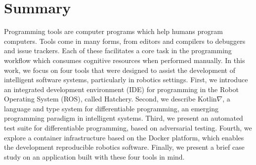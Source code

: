 \documentclass[12pt,initial,twoside,maitrise]{dms}
\numberwithin{equation}{section}
\numberwithin{table}{chapter}
\numberwithin{figure}{chapter}
\begin{document}

\chapter*{Summary}

Programming tools are computer programs which help humans program computers. Tools come in many forms, from editors and compilers to debuggers and issue trackers. Each of these facilitates a core task in the programming workflow which consumes cognitive resources when performed manually. In this work, we focus on four tools that were designed to assist the development of intelligent software systems, particularly in robotics settings. First, we introduce an integrated development environment (IDE) for programming in the Robot Operating System (ROS), called Hatchery. Second, we describe Kotlin$\nabla$, a language and type system for differentiable programming, an emerging programming paradigm in intelligent systems. Third, we present an automated test suite for differentiable programming, based on adversarial testing. Fourth, we explore a container infrastructure based on the Docker platform, which enables the development reproducible robotics software. Finally, we present a brief case study on an application built with these four tools in mind.
\end{document}

